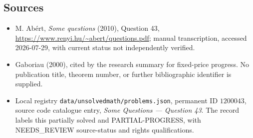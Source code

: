 \documentclass[11pt]{article}
\begin{document}
\subsection{Sources}
\begin{itemize}
\item M. Ab\'ert, \emph{Some questions} (2010), Question 43, \url{https://www.renyi.hu/~abert/questions.pdf}; manual transcription, accessed 2026-07-29, with current status not independently verified.
\item Gaboriau (2000), cited by the research summary for fixed-price progress. No publication title, theorem number, or further bibliographic identifier is supplied.
\item Local registry \texttt{data/unsolvedmath/problems.json}, permanent ID $1200043$, source code catalogue entry, \emph{Some Questions --- Question 43}. The record labels this partially solved and PARTIAL-PROGRESS, with NEEDS\_REVIEW source-status and rights qualifications.
\end{itemize}
\end{document}

